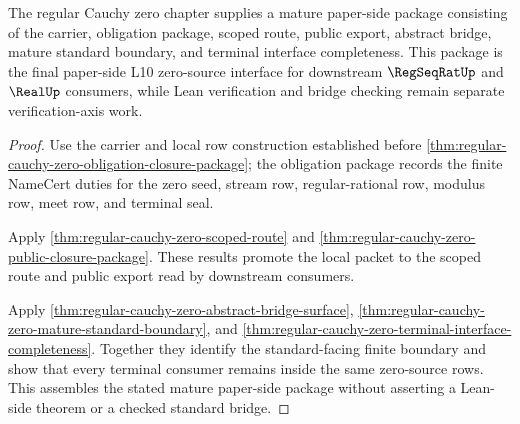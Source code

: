 \begin{theorem}
\label{thm:regular-cauchy-zero-mature-closure-package}
The regular Cauchy zero chapter supplies a mature paper-side package
consisting of the carrier, obligation package, scoped route, public export,
abstract bridge, mature standard boundary, and terminal interface
completeness. This package is the final paper-side L10 zero-source interface
for downstream $\RegSeqRatUp$ and $\RealUp$ consumers, while Lean
verification and bridge checking remain separate verification-axis work.
\end{theorem}
\begin{proof}
Use the carrier and local row construction established before
\autoref{thm:regular-cauchy-zero-obligation-closure-package}; the obligation
package records the finite NameCert duties for the zero seed, stream row,
regular-rational row, modulus row, meet row, and terminal seal.

Apply \autoref{thm:regular-cauchy-zero-scoped-route} and
\autoref{thm:regular-cauchy-zero-public-closure-package}. These results
promote the local packet to the scoped route and public export read by
downstream consumers.

Apply \autoref{thm:regular-cauchy-zero-abstract-bridge-surface},
\autoref{thm:regular-cauchy-zero-mature-standard-boundary}, and
\autoref{thm:regular-cauchy-zero-terminal-interface-completeness}. Together
they identify the standard-facing finite boundary and show that every
terminal consumer remains inside the same zero-source rows. This assembles
the stated mature paper-side package without asserting a Lean-side theorem
or a checked standard bridge.
\end{proof}

